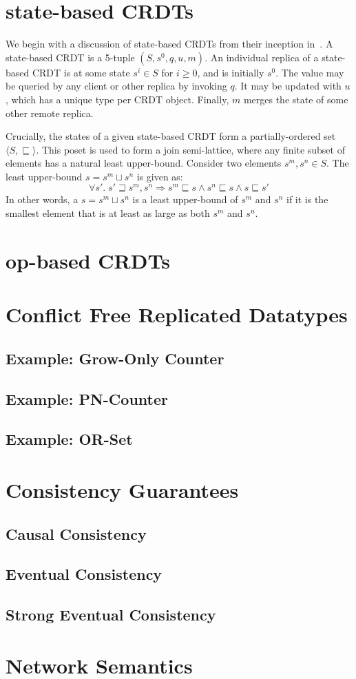 \section{state-based CRDTs}
We begin with a discussion of state-based CRDTs from their inception
in~\citep{shapario11}. A state-based CRDT is a 5-tuple $(S, s^0, q, u, m)$. An
individual replica of a state-based CRDT is at some state $s^i \in S$ for $i \ge
0$, and is initially $s^0$. The value may be queried by any client or other
replica by invoking $q$. It may be updated with $u$, which has a unique type per
CRDT object. Finally, $m$ merges the state of some other remote replica.

Crucially, the states of a given state-based CRDT form a partially-ordered set
$\langle S, \sqsubseteq \rangle$. This poset is used to form a join
semi-lattice, where any finite subset of elements has a natural least
upper-bound. Consider two elements $s^m, s^n \in S$. The least upper-bound
$s = s^m \sqcup s^n$ is given as:
\[
  \forall s'.\; s' \sqsupseteq s^m, s^n \Rightarrow
    s^m \sqsubseteq s \land
    s^n \sqsubseteq s \land
    s \sqsubseteq s'
\]
In other words, a $s = s^m \sqcup s^n$ is a least upper-bound of $s^m$ and $s^n$
if it is the smallest element that is at least as large as both $s^m$ and $s^n$.

\section{op-based CRDTs}
\label{sec:op-based-crdts}

\section{Conflict Free Replicated Datatypes}
\subsection{Example: Grow-Only Counter}
\label{sec:example-gcounter}

\subsection{Example: PN-Counter}
\subsection{Example: OR-Set}
\section{Consistency Guarantees}
\subsection{Causal Consistency}
\subsection{Eventual Consistency}
\subsection{Strong Eventual Consistency}
\section{Network Semantics}
